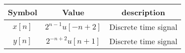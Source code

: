 \begin{table}[!h]
\begin{center}
\renewcommand\thetable{1}
\begin{tabular}{ |c|c|c| } 
  \hline
    Symbol & Value & description \\ 
  \hline
  $x[n] $ & $2^{n-1}u[-n+2]$ & Discrete time signal  \\ 
  \hline
  $y[n] $ & $2^{-n+2}u[n+1]$ & Discrete time signal  \\ 
  \hline
\end{tabular}
\end{center}
\caption{}
\end{table}
